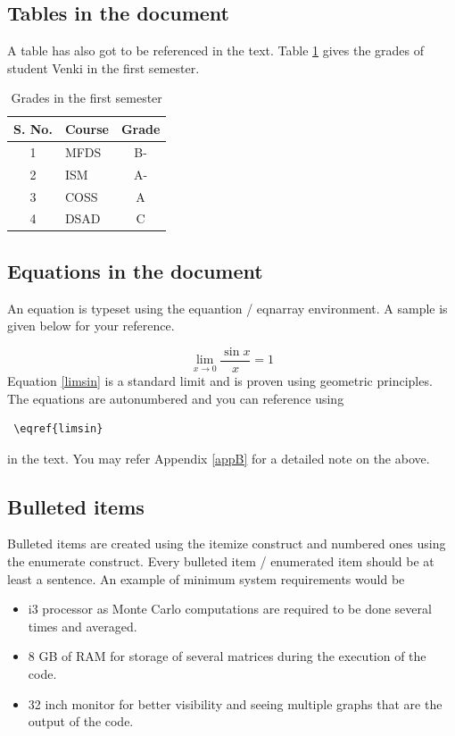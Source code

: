 \documentclass{book}
\begin{document}
\subsection{Tables in the document}
A table has also got to be referenced in the text. 
Table \ref{grades} gives the grades of student Venki in the first semester. 
\begin{table}[!h]
	\begin{center}
		\begin{tabular}{|c|l|c|}
			\hline
			S. No. & Course & Grade \\
			\hline
			1 & MFDS & B- \\
			\hline
			2 & ISM & A- \\
			\hline
			3 & COSS & A \\
			\hline
			4 & DSAD & C \\
			\hline
		\end{tabular}
		\caption{Grades in the first semester}
		\label{grades}
	\end{center}
\end{table}

\subsection{Equations in the document}

An equation is typeset using the equantion / eqnarray environment. A sample is given below for your reference. 

\begin{equation}
	\displaystyle \lim_{x \rightarrow 0} \frac{\sin{x}}{x} = 1
	\label{limsin}
\end{equation}
Equation \eqref{limsin} is a standard limit and is proven using geometric principles. 
The equations are autonumbered and you can reference using \begin{verbatim} \eqref{limsin} \end{verbatim} in the text. 
You may refer Appendix \ref{appB} for a detailed note on the above. 
\subsection{Bulleted items}

Bulleted items are created using the itemize construct and numbered ones using the enumerate construct. Every bulleted item / enumerated item should be at least a sentence. An example of minimum system requirements would be 

\begin{itemize}
\item i3 processor as Monte Carlo computations are required to be done several times and averaged.  
\item 8 GB of RAM for storage of several matrices during the execution of the code. 
\item 32 inch monitor for better visibility and seeing multiple graphs that are the output of the code.
\end{itemize}
\end{document}
